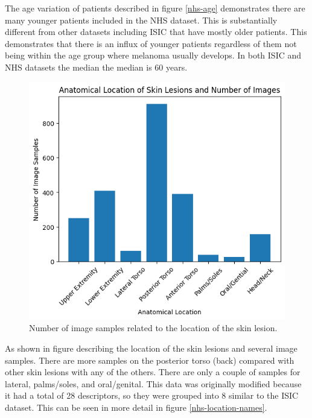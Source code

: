 The age variation of patients described in figure \ref{nhs-age} demonstrates there are many younger patients included in the NHS dataset. This is substantially different from other datasets including ISIC that have mostly older patients. This demonstrates that there is an influx of younger patients regardless of them not being within the age group where melanoma usually develops. In both ISIC and NHS datasets the median the median is 60 years.

\begin{figure}
	\centering
	\includegraphics[scale=0.8]{images/nhs/nhs-location.png}
	\caption{Number of image samples related to the location of the skin lesion.} 
\end{figure}\label{nhs-location}

As shown in figure \cite{nhs-location} describing the location of the skin lesions and several image samples. There are more samples on the posterior torso (back) compared with other skin lesions with any of the others. There are only a couple of samples for lateral, palms/soles, and oral/genital. This data was originally modified because it had a total of 28 descriptors, so they were grouped into 8 similar to the ISIC dataset. This can be seen in more detail in figure \ref{nhs-location-names}.

